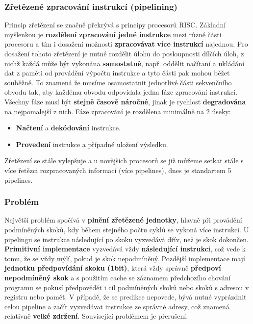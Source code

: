 \subsubsection{Zřetězené zpracování instrukcí (pipelining)}
Princip zřetězení se značně překrývá s principy procesorů RISC.
 Základní myšlenkou je \textbf{rozdělení zpracování jedné instrukce} mezi různé části procesoru a tím i dosažení možnosti \textbf{zpracovávat} \textbf{více instrukcí }najednou. Pro dosažení tohoto zřetězení je nutné rozdělit úlohu do posloupnosti dílčích úloh, z nichž každá může být vykonána \textbf{samostatně}, např. oddělit načítaní a ukládání dat z paměti od provádění výpočtu instrukce a tyto části pak mohou běžet souběžně. To znamená že musíme osamostatnit jednotlivé části sekvenčního obvodu tak, aby každému obvodu odpovídala jedna fáze zpracování instrukcí. Všechny fáze musí být \textbf{stejně časově náročné}, jinak je rychlost \textbf{degradována} na nejpomalejší z nich. Fáze zpracování je rozdělena minimálně na 2 úseky:
\begin{itemize}
\item \textbf{Načtení} a \textbf{dekódování} instrukce.
\item \textbf{Provedení} instrukce a případné uložení výsledku.
\end{itemize}
Zřetězení se stále vylepšuje a u novějších procesorů se již můžeme setkat stále s více řetězci rozpracovaných informací (více pipelines), dnes je standartem 5 pipelines.

\subsubsection*{Problém}
Největší problém spočívá v \textbf{plnění zřetězené jednotky}, hlavně při provádění podmíněných skoků, kdy během stejného počtu cyklů se vykoná více instrukcí. U pipelingu se instrukce následující po skoku vyzvedává dřív, než je skok dokončen. \textbf{Primitivní implementace} vyzvedává vždy \textbf{následující instrukci}, což vede k tomu, že se vždy mýlí, pokud je skok nepodmíněný. Pozdější implementace mají \textbf{jednotku předpovídání skoku (1bit)}, která vždy správně \textbf{předpoví nepodmíněný skok} a s použitím cache se záznamem předchozího chování programu se pokusí předpovědět i cíl podmíněných skoků nebo skoků s adresou v registru nebo paměť. V případě, že se predikce nepovede, bývá nutné vyprázdnit celou pipeline a začít vyzvedávat instrukce ze správné adresy, což znamená relativně \textbf{velké zdržení}. Související problémem je přerušení.

